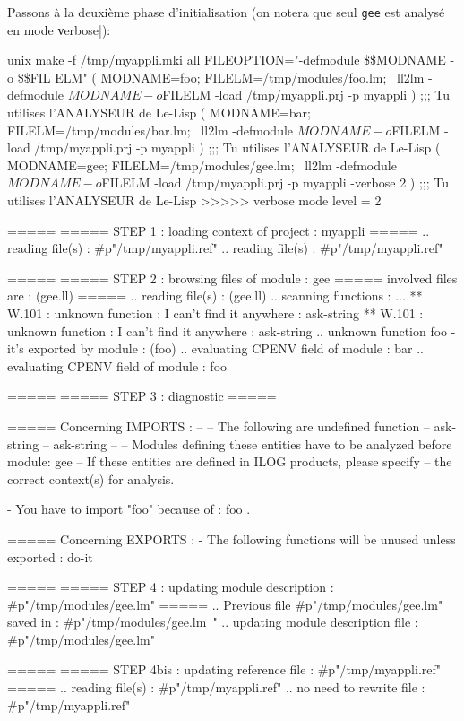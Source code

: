 Passons \`{a} la deuxi\`{e}me phase d'initialisation (on notera que seul
{\tt gee} est analys\'{e} en mode \|verbose|):
\begin{Longcode*}
unix%
make -f /tmp/myappli.mki all FILEOPTION="-defmodule \$\$MODNAME -o \$\$FIL
ELM"
( MODNAME=foo;  FILELM=/tmp/modules/foo.lm;  \
ll2lm -defmodule $MODNAME -o $FILELM -load /tmp/myappli.prj -p myappli
 )
;;; Tu utilises l'ANALYSEUR de Le-Lisp
( MODNAME=bar;  FILELM=/tmp/modules/bar.lm;  \
ll2lm -defmodule $MODNAME -o $FILELM -load /tmp/myappli.prj -p myappli
 )
;;; Tu utilises l'ANALYSEUR de Le-Lisp
( MODNAME=gee;  FILELM=/tmp/modules/gee.lm;  \
ll2lm -defmodule $MODNAME -o $FILELM -load /tmp/myappli.prj -p myappli
 -verbose 2 )
;;; Tu utilises l'ANALYSEUR de Le-Lisp
>>>>> verbose mode level = 2

=====
===== STEP 1 : loading context of project : myappli
=====
.. reading file(s) : #p"/tmp/myappli.ref"
.. reading file(s) : #p"/tmp/myappli.ref"

=====
===== STEP 2 : browsing files of module : gee
=====          involved files are : (gee.ll)
=====
.. reading file(s) : (gee.ll)
.. scanning functions : ...
** W.101 : unknown function : I can't find it anywhere : ask-string
** W.101 : unknown function : I can't find it anywhere : ask-string
.. unknown function foo - it's exported by module : (foo)
.. evaluating CPENV field of module : bar
.. evaluating CPENV field of module : foo

=====
===== STEP 3 : diagnostic
=====

===== Concerning IMPORTS :
--
-- The following are undefined function
--      ask-string
--      ask-string
--
-- Modules defining these entities have to be analyzed before module: gee
-- If these entities are defined in ILOG products, please specify
-- the correct context(s) for analysis.


- You have to import "foo" because of :
 foo .

===== Concerning EXPORTS :
- The following functions will be unused unless exported :
     do-it

=====
===== STEP 4 : updating module description : #p"/tmp/modules/gee.lm"
=====
.. Previous file #p"/tmp/modules/gee.lm" saved in :
#p"/tmp/modules/gee.lm~"
.. updating module description file : #p"/tmp/modules/gee.lm"

=====
===== STEP 4bis : updating reference file : #p"/tmp/myappli.ref"
=====
.. reading file(s) : #p"/tmp/myappli.ref"
.. no need to rewrite file : #p"/tmp/myappli.ref"

\end{Longcode*}

